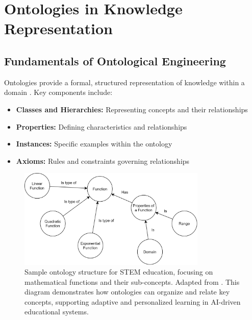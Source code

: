 \section{Ontologies in Knowledge Representation}

\subsection{Fundamentals of Ontological Engineering}
Ontologies provide a formal, structured representation of knowledge within a domain \cite{nananukul2023halo}. Key components include:

\begin{itemize}
    \item \textbf{Classes and Hierarchies:} Representing concepts and their relationships
    \item \textbf{Properties:} Defining characteristics and relationships
    \item \textbf{Instances:} Specific examples within the ontology
    \item \textbf{Axioms:} Rules and constraints governing relationships
\end{itemize}

\begin{figure}[ht]
    \centering
    \includegraphics[width=0.8\textwidth]{figures/diagrams/ExampleOntology.png}
    \caption{Sample ontology structure for STEM education, focusing on mathematical functions and their sub-concepts. Adapted from \cite{mendel2024hypercubes}. This diagram demonstrates how ontologies can organize and relate key concepts, supporting adaptive and personalized learning in AI-driven educational systems.}
    \label{fig:ontology-math-functions}
\end{figure}

